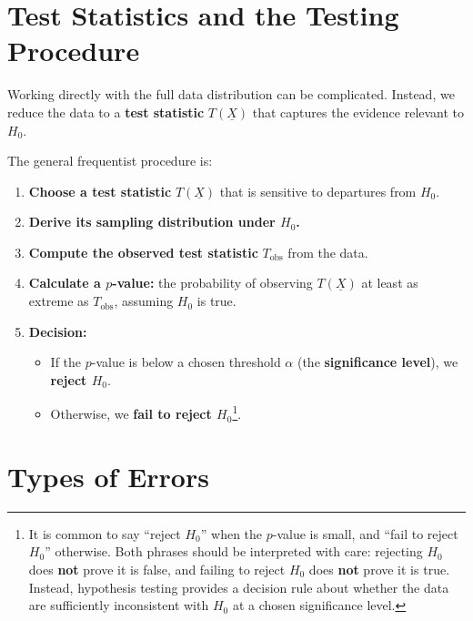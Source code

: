 \documentclass[
  letterpaper,
  DIV=11,
  numbers=noendperiod]{scrreprt}
\providecommand{\tightlist}{%
  \setlength{\itemsep}{0pt}\setlength{\parskip}{0pt}}
\theoremstyle{definition}
\theoremstyle{plain}
\theoremstyle{definition}
\theoremstyle{remark}
\begin{document}
\section{Test Statistics and the Testing
Procedure}\label{test-statistics-and-the-testing-procedure}

Working directly with the full data distribution can be complicated.
Instead, we reduce the data to a \textbf{test statistic}
\(T(\underline{X})\) that captures the evidence relevant to \(H_0\).

The general frequentist procedure is:

\begin{enumerate}
\def\labelenumi{\arabic{enumi}.}
\item
  \textbf{Choose a test statistic} \(T(\underline{X})\) that is
  sensitive to departures from \(H_0\).
\item
  \textbf{Derive its sampling distribution under \(H_0\).}
\item
  \textbf{Compute the observed test statistic} \(T_{\text{obs}}\) from
  the data.
\item
  \textbf{Calculate a \(p\)-value:} the probability of observing
  \(T(\underline{X})\) at least as extreme as \(T_{\text{obs}}\),
  assuming \(H_0\) is true.
\item
  \textbf{Decision:}

  \begin{itemize}
  \tightlist
  \item
    If the \(p\)-value is below a chosen threshold \(\alpha\) (the
    \textbf{significance level}), we \textbf{reject \(H_0\)}.
  \item
    Otherwise, we \textbf{fail to reject \(H_0\)}\footnote{It is common
      to say ``reject \(H_0\)'' when the \(p\)-value is small, and
      ``fail to reject \(H_0\)'' otherwise. Both phrases should be
      interpreted with care: rejecting \(H_0\) does \textbf{not} prove
      it is false, and failing to reject \(H_0\) does \textbf{not} prove
      it is true. Instead, hypothesis testing provides a decision rule
      about whether the data are sufficiently inconsistent with \(H_0\)
      at a chosen significance level.}.
  \end{itemize}
\end{enumerate}

\section{Types of Errors}\label{types-of-errors}
\end{document}
